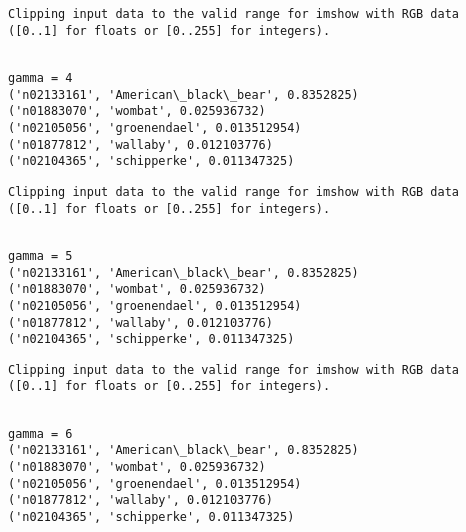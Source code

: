 \documentclass[11pt]{article}
\begin{document}
    \begin{Verbatim}[commandchars=\\\{\}]
Clipping input data to the valid range for imshow with RGB data ([0..1] for floats or [0..255] for integers).

    \end{Verbatim}

    \begin{Verbatim}[commandchars=\\\{\}]

gamma = 4
('n02133161', 'American\_black\_bear', 0.8352825)
('n01883070', 'wombat', 0.025936732)
('n02105056', 'groenendael', 0.013512954)
('n01877812', 'wallaby', 0.012103776)
('n02104365', 'schipperke', 0.011347325)

    \end{Verbatim}

    \begin{Verbatim}[commandchars=\\\{\}]
Clipping input data to the valid range for imshow with RGB data ([0..1] for floats or [0..255] for integers).

    \end{Verbatim}

    \begin{Verbatim}[commandchars=\\\{\}]

gamma = 5
('n02133161', 'American\_black\_bear', 0.8352825)
('n01883070', 'wombat', 0.025936732)
('n02105056', 'groenendael', 0.013512954)
('n01877812', 'wallaby', 0.012103776)
('n02104365', 'schipperke', 0.011347325)

    \end{Verbatim}

    \begin{Verbatim}[commandchars=\\\{\}]
Clipping input data to the valid range for imshow with RGB data ([0..1] for floats or [0..255] for integers).

    \end{Verbatim}

    \begin{Verbatim}[commandchars=\\\{\}]

gamma = 6
('n02133161', 'American\_black\_bear', 0.8352825)
('n01883070', 'wombat', 0.025936732)
('n02105056', 'groenendael', 0.013512954)
('n01877812', 'wallaby', 0.012103776)
('n02104365', 'schipperke', 0.011347325)

    \end{Verbatim}
\end{document}
